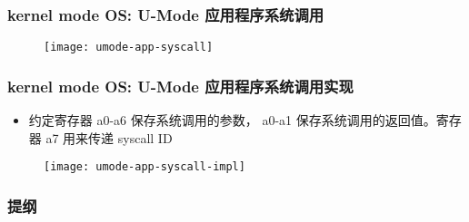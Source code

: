 \begin{frame}
    \frametitle{kernel mode OS: U-Mode 应用程序系统调用}
%        
%        
%        
    \begin{figure}
        \centering
        \texttt{[image: umode-app-syscall]}
    \end{figure}
\end{frame}
\begin{frame}
    \frametitle{kernel mode OS: U-Mode 应用程序系统调用实现}
        \begin{itemize}
            
            \item 约定寄存器 a0-a6 保存系统调用的参数， a0-a1 保存系统调用的返回值。寄存器 a7 用来传递 syscall ID
            
        \end{itemize}	
    \begin{figure}
        \centering
        \texttt{[image: umode-app-syscall-impl]}
    \end{figure}
\end{frame}

\begin{frame}
    \frametitle{提纲} 
    \tableofcontents 
\end{frame}

